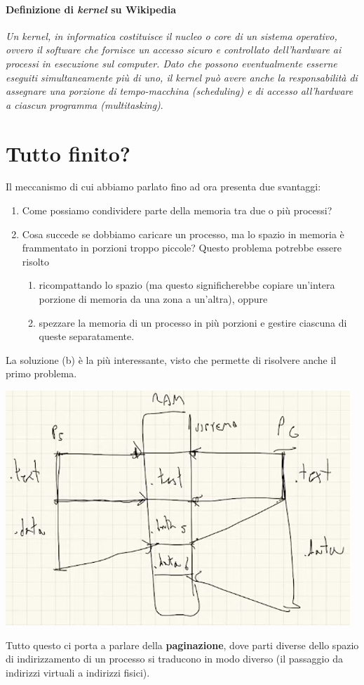 \documentclass[11pt]{report}
\theoremstyle{definition}
\begin{document}
\paragraph{Definizione di \emph{kernel} su Wikipedia} \textit{Un kernel, in informatica costituisce il nucleo o core di un sistema operativo, ovvero il software che fornisce un accesso sicuro e controllato dell'hardware ai processi in esecuzione sul computer. Dato che possono eventualmente esserne eseguiti simultaneamente più di uno, il kernel può avere anche la responsabilità di assegnare una porzione di tempo-macchina (scheduling) e di accesso all'hardware a ciascun programma (multitasking)}.

\clearpage 

\section{Tutto finito?}

Il meccanismo di cui abbiamo parlato fino ad ora presenta due svantaggi:
\begin{enumerate}
	\item Come possiamo condividere parte della memoria tra due o più processi?
	\item Cosa succede se dobbiamo caricare un processo, ma lo spazio in memoria è frammentato in porzioni troppo piccole? Questo problema potrebbe essere risolto
	\begin{enumerate}
		\item ricompattando lo spazio (ma questo significherebbe copiare un'intera porzione di memoria da una zona a un'altra), oppure
		\item spezzare la memoria di un processo in più porzioni e gestire ciascuna di queste separatamente.
	\end{enumerate}
\end{enumerate}
La soluzione (b) è la più interessante, visto che permette di risolvere anche il primo problema. 
\begin{center}
	\includegraphics[scale=.8]{img/211.PNG}
\end{center} Tutto questo ci porta a parlare della \textbf{paginazione}, dove parti diverse dello spazio di indirizzamento di un processo si traducono in modo diverso (il passaggio da indirizzi virtuali a indirizzi fisici).
\end{document}
